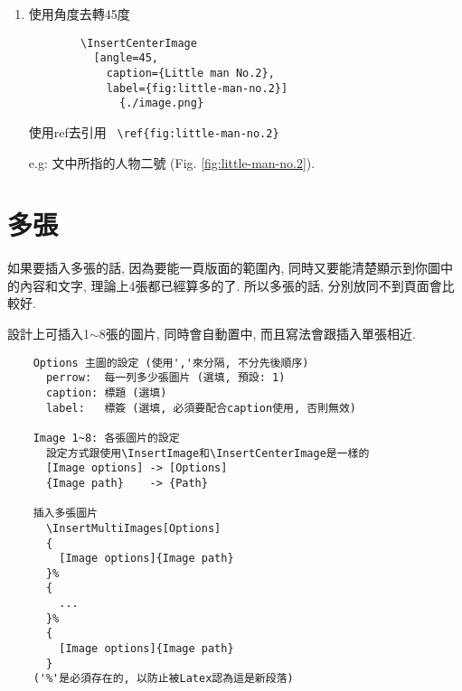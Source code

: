 \begin{enumerate}
{      之後可以使用ref去引用 \verb| \ref{fig:little-man-no.1} |

      e.g: 文中所指的人物一號 (Fig. \ref{fig:little-man-no.1}).
    } %

    \item
    {
      使用角度去轉45度
      \begin{verbatim}
        \InsertCenterImage
          [angle=45,
            caption={Little man No.2},
            label={fig:little-man-no.2}]
              {./image.png}
      \end{verbatim}

      使用ref去引用 \verb| \ref{fig:little-man-no.2} |

      e.g: 文中所指的人物二號 (Fig. \ref{fig:little-man-no.2}).
    } %

  \end{enumerate}

\newpage
\section{多張}

  如果要插入多張的話, 因為要能一頁版面的範圍內, 同時又要能清楚顯示到你圖中的內容和文字, 理論上4張都已經算多的了. 所以多張的話, 分別放同不到頁面會比較好.

  設計上可插入1$\sim$8張的圖片, 同時會自動置中, 而且寫法會跟插入單張相近.

  \begin{framed}
  \begin{verbatim}
    Options 主圖的設定 (使用','來分隔, 不分先後順序)
      perrow:  每一列多少張圖片 (選填, 預設: 1)
      caption: 標題 (選填)
      label:   標簽 (選填, 必須要配合caption使用, 否則無效)

    Image 1~8: 各張圖片的設定
      設定方式跟使用\InsertImage和\InsertCenterImage是一樣的
      [Image options] -> [Options]
      {Image path}    -> {Path}

    插入多張圖片
      \InsertMultiImages[Options]
      {
        [Image options]{Image path}
      }%
      {
        ...
      }%
      {
        [Image options]{Image path}
      }
    ('%'是必須存在的, 以防止被Latex認為這是新段落)
  \end{verbatim}
  \end{framed}

